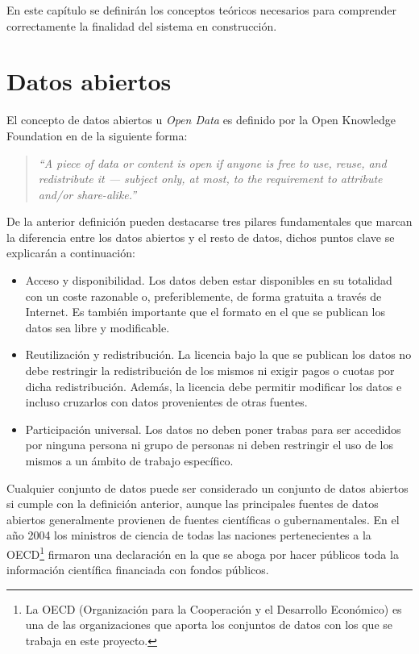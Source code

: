 En este capítulo se definirán los conceptos teóricos necesarios para comprender correctamente la finalidad del sistema en construcción.

\section{Datos abiertos}
El concepto de datos abiertos u \textit{Open Data} es definido por la Open Knowledge Foundation en \cite{opendefinition} de la siguiente forma:
\begin{quote}
\textit{``A piece of data or content is open if anyone is free to use, reuse, and redistribute it — subject only, at most, to the requirement to attribute and/or share-alike.''}
\end{quote}

De la anterior definición pueden destacarse tres pilares fundamentales que marcan la diferencia entre los datos abiertos y el resto de datos, dichos puntos clave se explicarán a continuación:
\begin{itemize}
\item Acceso y disponibilidad. Los datos deben estar disponibles en su totalidad con un coste razonable o, preferiblemente, de forma gratuita a través de Internet.  Es también importante que el formato en el que se publican los datos sea libre y modificable.
\item Reutilización y redistribución.  La licencia bajo la que se publican los datos no debe restringir la redistribución de los mismos ni exigir pagos o cuotas por dicha redistribución.  Además, la licencia debe permitir modificar los datos e incluso cruzarlos con datos provenientes de otras fuentes.
\item Participación universal.  Los datos no deben poner trabas para ser accedidos por ninguna persona ni grupo de personas ni deben restringir el uso de los mismos a un ámbito de trabajo específico.
\end{itemize}

Cualquier conjunto de datos puede ser considerado un conjunto de datos abiertos si cumple con la definición anterior, aunque las principales fuentes de datos abiertos generalmente provienen de fuentes científicas o gubernamentales.  En el año 2004 los ministros de ciencia de todas las naciones pertenecientes a la OECD\footnote{La OECD (Organización para la Cooperación y el Desarrollo Económico) es una de las organizaciones que aporta los conjuntos de datos con los que se trabaja en este proyecto.} firmaron una declaración en la que se aboga por hacer públicos toda la información científica financiada con fondos públicos.

